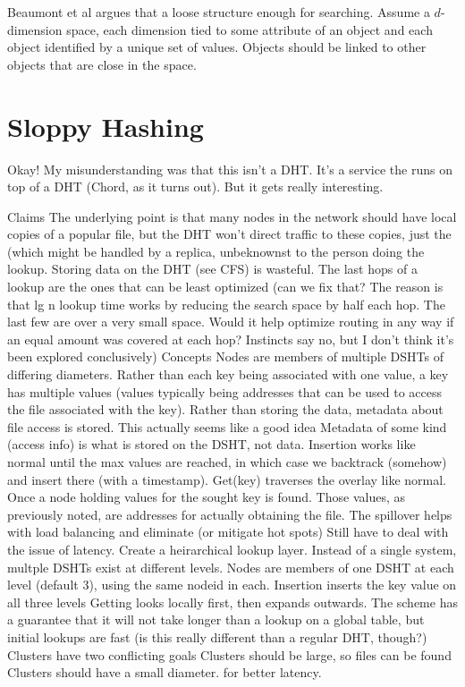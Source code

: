 \documentclass[10pt,letterpaper]{report}
\begin{document}
Beaumont et al argues that a loose structure enough for searching.  Assume a $d$-dimension space, each dimension tied to some attribute of an object and each object identified by a unique set of values.  Objects should be linked to other objects that are close in the space.


\section{Sloppy Hashing}

Okay!  My misunderstanding was that this isn't a DHT.  It's a service the runs on top of a DHT (Chord, as it turns out).  But it gets really interesting.

Claims
The underlying point is  that many nodes in the network should have local copies of a popular file, but the DHT won't direct traffic to these copies, just the  (which  might be handled by a replica, unbeknownst to the person doing the lookup.
Storing data on the DHT (see CFS) is wasteful.
The last hops of a lookup are the ones that can be least optimized (can we fix that?  The reason is that lg n lookup time works by reducing the search space by half each hop.  The last few are over a very small space.  Would it help optimize routing in any way if an equal amount was covered at each hop?  Instincts say no, but I don't think it's been explored conclusively)
Concepts
Nodes are members of multiple DSHTs of differing diameters. 
Rather than each key being associated with one value, a key has multiple values (values typically being addresses that can be used to access the file associated with the key).  Rather than storing the data, metadata about file access is stored.  This actually seems like a good idea
Metadata of some kind (access info) is what is stored on the DSHT, not data.
Insertion works like normal until the max values are reached, in which  case we backtrack (somehow) and insert there (with a timestamp).
Get(key) traverses the overlay like normal.  Once a node holding values for the sought key is found.  Those values, as previously noted, are addresses for actually obtaining the file. 
The spillover helps with load balancing and eliminate (or mitigate hot spots)
Still have to deal with the issue of latency.  Create a heirarchical lookup layer.
Instead of a single system, multple DSHTs exist at different levels.
Nodes are members of one  DSHT at each level (default 3), using the same nodeid in each.
Insertion inserts the key value on all three levels 
Getting looks locally first, then expands outwards.  The scheme has a guarantee that it will not take longer than a lookup on a  global table, but initial lookups are fast  (is this really different than a regular DHT, though?)
Clusters have two conflicting goals
Clusters should be large, so files can be found
Clusters should have a small diameter. for better latency.
\end{document}
